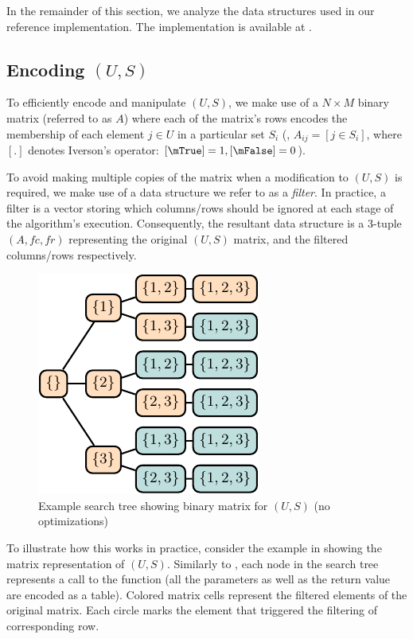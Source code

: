 In the remainder of this section, we analyze the data structures used
in our reference implementation.
%
The implementation is available at \mhsIIURL{}.

\subsection{Encoding \texorpdfstring{$(U,S)$}{(U,S)}}
To efficiently encode and manipulate $(U,S)$, we make use of a $N
\times M$ binary matrix (referred to as $A$) where each of the
matrix's rows encodes the membership of each element $j \in U$ in a
particular set $S_i$ (\ie, $A_{ij} = [j \in S_i]$, where $[.]$ denotes
Iverson's operator: $[\mTrue] = 1, [\mFalse] = 0$).

To avoid making multiple copies of the matrix when a modification to
$(U,S)$ is required, we make use of a data structure we refer to as a
\emph{filter}.
%
In practice, a filter is a vector storing which columns/rows should be
ignored at each stage of the algorithm's execution.
%
Consequently, the resultant data structure is a 3-tuple $(A,fc,fr)$
representing the original $(U,S)$ matrix, and the filtered
columns/rows respectively.

\begin{figure}[!ht]
  \includegraphics[page=4]{figures/mhs2/figures/opts/main}
  \caption{Example search tree showing binary matrix for $(U,S)$ (no
    optimizations)}
  \label{fig:mhs2o:search-tree-spectrum}
\end{figure}
To illustrate how this works in practice, consider the example in
 showing the matrix
representation of $(U,S)$.
%
Similarly to , each node
in the search tree represents a call to the function (all the
parameters as well as the return value are encoded as a table).
%
Colored matrix cells represent the filtered elements of the original
matrix.
%
Each circle marks the element that triggered the filtering of
corresponding row.

